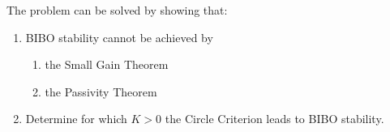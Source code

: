 The problem can be solved by showing that:
\begin{enumerate}
  \item BIBO stability cannot be achieved by
    \begin{enumerate}
    \item the Small Gain Theorem
    \item the Passivity Theorem
    \end{enumerate}
  \item Determine for which $K>0$ the Circle Criterion leads to BIBO stability.
\end{enumerate}